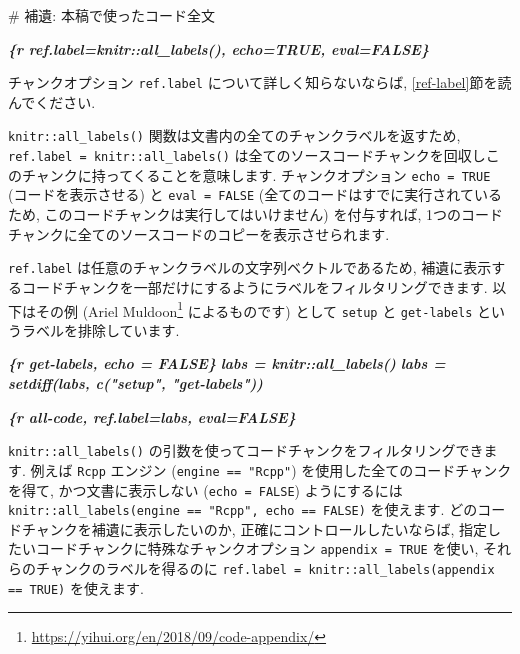 \documentclass[
  11pt,
  lualatex,
  ja=standard]{bxjsreport}
\newenvironment{Shaded}{\begin{snugshade}}{\end{snugshade}}
\newcommand{\FunctionTok}[1]{\textcolor[rgb]{0.00,0.00,0.00}{#1}}
\newcommand{\InformationTok}[1]{\textcolor[rgb]{0.56,0.35,0.01}{\textbf{\textit{#1}}}}
\renewcommand{\href}[2]{#2\footnote{\url{#1}}}
\begin{document}
\begin{Shaded}
\begin{Highlighting}[]
\FunctionTok{\# 補遺: 本稿で使ったコード全文}

\InformationTok{\textasciigrave{}\textasciigrave{}\textasciigrave{}\{r ref.label=knitr::all\_labels(), echo=TRUE, eval=FALSE\}}
\InformationTok{\textasciigrave{}\textasciigrave{}\textasciigrave{}}
\end{Highlighting}
\end{Shaded}

チャンクオプション \texttt{ref.label} について詳しく知らないならば, \ref{ref-label}節を読んでください.

\texttt{knitr::all\_labels()} 関数は文書内の全てのチャンクラベルを返すため, \texttt{ref.label = knitr::all\_labels()} は全てのソースコードチャンクを回収しこのチャンクに持ってくることを意味します. チャンクオプション \texttt{echo = TRUE} (コードを表示させる) と \texttt{eval = FALSE} (全てのコードはすでに実行されているため, このコードチャンクは実行してはいけません) を付与すれば, 1つのコードチャンクに全てのソースコードのコピーを表示させられます.

\texttt{ref.label} は任意のチャンクラベルの文字列ベクトルであるため, 補遺に表示するコードチャンクを一部だけにするようにラベルをフィルタリングできます. 以下はその例 (\href{https://yihui.org/en/2018/09/code-appendix/}{Ariel Muldoon} によるものです) として \texttt{setup} と \texttt{get-labels} というラベルを排除しています.

\begin{Shaded}
\begin{Highlighting}[]
\InformationTok{\textasciigrave{}\textasciigrave{}\textasciigrave{}\{r get{-}labels, echo = FALSE\}}
\InformationTok{labs = knitr::all\_labels()}
\InformationTok{labs = setdiff(labs, c("setup", "get{-}labels"))}
\InformationTok{\textasciigrave{}\textasciigrave{}\textasciigrave{}}

\InformationTok{\textasciigrave{}\textasciigrave{}\textasciigrave{}\{r all{-}code, ref.label=labs, eval=FALSE\}}
\InformationTok{\textasciigrave{}\textasciigrave{}\textasciigrave{}}
\end{Highlighting}
\end{Shaded}

\texttt{knitr::all\_labels()} の引数を使ってコードチャンクをフィルタリングできます. 例えば \texttt{Rcpp} エンジン (\texttt{engine == "Rcpp"}) を使用した全てのコードチャンクを得て, かつ文書に表示しない (\texttt{echo = FALSE}) ようにするには \texttt{knitr::all\_labels(engine == "Rcpp", echo == FALSE)} を使えます. どのコードチャンクを補遺に表示したいのか, 正確にコントロールしたいならば, 指定したいコードチャンクに特殊なチャンクオプション \texttt{appendix = TRUE} を使い, それらのチャンクのラベルを得るのに \texttt{ref.label = knitr::all\_labels(appendix == TRUE)} を使えます.
\end{document}
